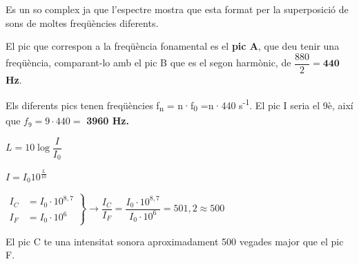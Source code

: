 \begin{solapartat}
 Es un so complex ja que l'espectre mostra que esta format per la superposició de sons de moltes freqüències diferents.

\medskip
{} El pic que correspon a la freqüència fonamental es el \textbf{pic A}, que deu tenir una freqüència, comparant-lo amb el pic B que es el segon harmònic, de $\dfrac{880}{2} = \mathbf{440}$ \textbf{Hz}.

\medskip
{} Els diferents pics tenen freqüències f\textsubscript{n} = n·f\textsubscript{0} =n·440 s\textsuperscript{-1}. El pic I seria el 9è, així que $f_9 = 9\cdot 440 =$ \textbf{3960 Hz.}
\end{solapartat}

\begin{solapartat}

 $L = 10\log\dfrac{I}{I_0}$

\smallskip
{} $I = I_0 10^{\frac{L}{10}}$

\smallskip
{}

\smallskip
$\left.\begin{aligned} I_C &= I_0\cdot 10^{8,7}\\ I_F &= I_0\cdot 10^{6} \end{aligned}\right\} \rightarrow \dfrac{I_C}{I_F} = \dfrac{I_0\cdot 10^{8,7}}{I_0\cdot 10^{6}} = 501,2 \approx 500$

\medskip
{} El pic C te una intensitat sonora aproximadament 500 vegades major que el pic F.
\end{solapartat}
